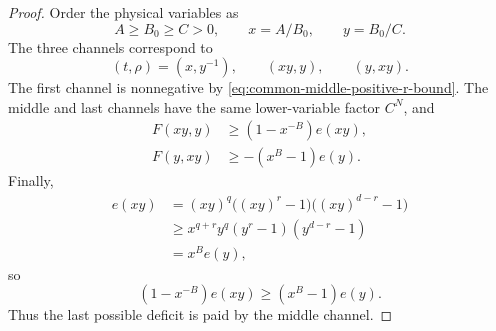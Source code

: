 \documentclass[11pt]{article}
\theoremstyle{definition}
\begin{document}
\begin{proof}
Order the physical variables as
\begin{equation*}
A\ge B_0\ge C>0,
\qquad
x=A/B_0,
\qquad
y=B_0/C.
\end{equation*}
The three channels correspond to
\begin{equation*}
(t,\rho)
=(x,y^{-1}),
\qquad
(xy,y),
\qquad
(y,xy).
\end{equation*}
The first channel is nonnegative by \eqref{eq:common-middle-positive-r-bound}.  The middle and last channels have the same lower-variable factor \(C^N\), and
\begin{align*}
F(xy,y)&\ge(1-x^{-B})e(xy),\\
F(y,xy)&\ge-(x^B-1)e(y).
\end{align*}
Finally,
\begin{align*}
e(xy)
&=(xy)^q\bigl((xy)^r-1\bigr)
       \bigl((xy)^{d-r}-1\bigr)\\
&\ge x^{q+r}y^q(y^r-1)(y^{d-r}-1)\\
&=x^B e(y),
\end{align*}
so
\begin{equation*}
(1-x^{-B})e(xy)
\ge(x^B-1)e(y).
\end{equation*}
Thus the last possible deficit is paid by the middle channel.


\end{proof}
\end{document}
